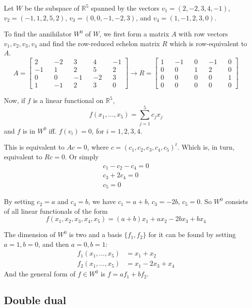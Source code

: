 \begin{example}
	Let $W$ be the subspace of $\mathbb{R}^5$ spanned by the vectors $v_1 = (2, -2, 3, 4, -1)$, $v_2 = (-1, 1, 2, 5, 2)$, $v_3 = (0, 0, -1, -2, 3)$, and $v_4 = (1, -1, 2, 3, 0)$.

	To find the annihilator $W^0$ of $W$, we first form a matrix $A$ with row vectors $v_1, v_2, v_3, v_4$ and find the row-reduced echelon matrix $R$ which is row-equivalent to $A$.
	\[
		A = \begin{bmatrix}
			2 && -2 && 3 && 4 && -1 \\
			-1 && 1 && 2 && 5 && 2 \\
			0 && 0 && -1 && -2 && 3 \\
			1 && -1 && 2 && 3 && 0
		\end{bmatrix}
		\longrightarrow
		R = \begin{bmatrix}
			1 && -1 && 0 && -1 && 0 \\
			0 && 0 && 1 && 2 && 0 \\
			0 && 0 && 0 && 0 && 1 \\
			0 && 0 && 0 && 0 && 0
		\end{bmatrix}
	\]

	Now, if $f$ is a linear functional on $\mathbb{R}^5$, 
	\[
		f(x_1, \ldots, x_5) = \sum_{j=1}^5 c_j x_j
	\]
	and $f$ is in $W^0$ iff. $f(v_i) = 0$, for $i = 1,2,3,4$.
	
	This is equivalent to $Ac = 0$, where $c = (c_1, c_2, c_3, c_4, c_5)^t$. Which is, in turn, equivalent to $Rc = 0$. Or simply
	\begin{equation*}
		\begin{aligned}
			c_1 - c_2 - c_4 = 0 \\
			c_3 + 2 c_4 = 0 \\
			c_5 = 0
		\end{aligned}
	\end{equation*}

	By setting $c_2 = a$ and $c_4 = b$, we have $c_1 = a+b$, $c_3 = -2b$, $c_5 = 0$. So $W^0$ consists of all linear functionals of the form
	\[
		f(x_1, x_2, x_3, x_4, x_5) = (a+b)x_1 + ax_2 - 2bx_3 + bx_4
	\]

	The dimension of $W^0$ is two and a basis $\{ f_1, f_2 \}$ for it can be found by setting $a = 1, b = 0$, and then $a = 0, b = 1$:
	\begin{equation*}
		\begin{aligned}
			f_1(x_1, \ldots, x_5) &= x_1 + x_2 \\
			f_2(x_1, \ldots, x_5) &= x_1 - 2x_3 + x_4
	\end{aligned}
\end{equation*}
	And the general form of $f \in W^0$ is $f = a f_1 + bf_2$.
\end{example}

\subsection{Double dual}

